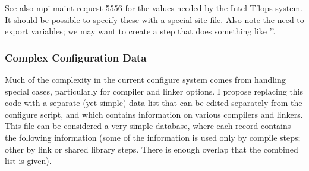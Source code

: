 \documentclass{article}
\begin{document}
See also mpi-maint request 5556 for the values needed by the Intel
Tflops system.  It should be possible to specify these with a special
site file.  Also note the need to export variables; we may want to
create a step that does something like ''.  

\subsubsection{Complex Configuration Data}
Much of the complexity in the current configure system comes from
handling special cases, particularly for compiler and linker options.
I propose replacing this code with a separate (yet simple) data list
that can be edited separately from the configure script, and which
contains information on various compilers and linkers.
This file can be considered a very simple database, where each record
contains the following information (some of the information is used
only by compile steps; other by link or shared library steps.  There
is enough overlap that the combined list is given).
\end{document}

